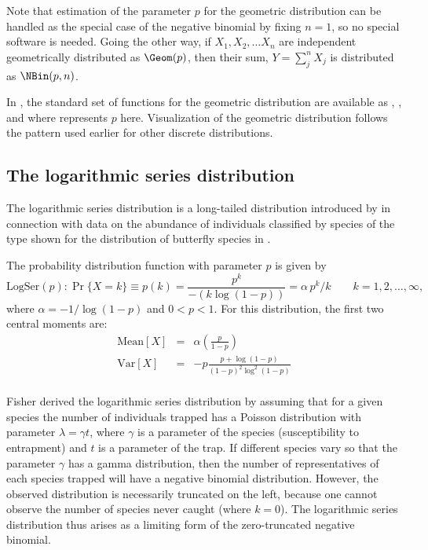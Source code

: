 \documentclass[11pt]{book}
\begin{document}
Note that estimation of the parameter $p$ for the geometric distribution
can be handled as the special case of the negative binomial by fixing $n=1$,
so no special software is needed.
Going the other way, if $X_1, X_2, \dots X_n$ are independent geometrically
distributed as $\Geom(p)$, then their sum, $Y = \sum_j^n X_j$ is distributed
as $\NBin(p, n)$.

In \R, the standard set of functions for the geometric distribution are
available as 
,
,
 and
 where  represents $p$ here.
Visualization of the geometric distribution follows the pattern used earlier
for other discrete distributions.


\subsection{The logarithmic series distribution}
The logarithmic series distribution is a long-tailed distribution
introduced by
\citet{Fisher-etal:43}
in connection with data on the abundance of individuals
classified by species of the type shown for the distribution of butterfly
species
in .

The probability distribution function with parameter $p$ is given by
\begin{equation}\label{eq:logseriesf}
\textrm{LogSer}(p): \Pr \{ X = k \} \equiv p ( k )  =
\frac{p^k}{-(k\log (1-p ))} =
\alpha \, p^k / k
\quad\quad k = 1, 2, \dots, \infty
\comma
\end{equation}
where $\alpha = -1 / \log(1 - p)$
and $0 < p <1$.
For this distribution, the first two central moments are:
\begin{eqnarray*}
\textrm{Mean}[X] & = & \alpha \left(\frac{p}{1-p}\right)\\
\textrm{Var}[X] &  = & -p \frac{p + \log(1-p)}{(1-p)^2 \log^2(1-p)}\\
\end{eqnarray*}


Fisher derived the logarithmic series distribution by assuming that
for a given species the number of individuals trapped has a Poisson
distribution with parameter $\lambda = \gamma t$, where
$\gamma$ is a parameter of the species (susceptibility to entrapment)
and $t$ is a parameter of the trap.
If different species vary so that the parameter $\gamma$ has a gamma
distribution, then the number of representatives of each species trapped
will have a negative binomial distribution.
However, the observed distribution is necessarily truncated on the left,
because one cannot observe the number of species never caught (where $k=0$).
The logarithmic series distribution thus arises as a limiting form of the
zero-truncated negative binomial.
\end{document}
